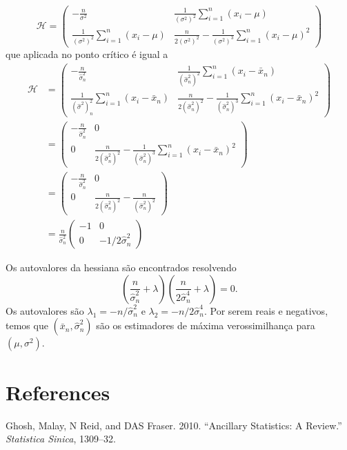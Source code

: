 \documentclass[
  letterpaper,
  DIV=11,
  numbers=noendperiod]{scrartcl}
\newlength{\cslhangindent}
\newenvironment{CSLReferences}[2] %
 {\begin{list}{}{%
  \setlength{\itemindent}{0pt}
  \setlength{\leftmargin}{0pt}
  \setlength{\parsep}{0pt}
  \ifodd #1
   \setlength{\leftmargin}{\cslhangindent}
   \setlength{\itemindent}{-1\cslhangindent}
  \fi
  \setlength{\itemsep}{#2\baselineskip}}}
 {\end{list}}
\begin{document}
\[\mathcal{H}=\left(\begin{array}{cc}
-\frac{n}{\sigma^2} & \frac{1}{(\sigma^2)^2}\sum_{i=1}^{n}(x_i-\mu) \\\frac{1}{(\sigma^2)^2}\sum_{i=1}^{n}(x_i-\mu) & \frac{n}{2(\sigma^2)^2} -\frac{1}{\left(\sigma^2\right)^3}\sum_{i=1}^{n}(x_i-\mu)^2
\end{array}\right)\] que aplicada no ponto crítico é igual a
\[\begin{align*}
\mathcal{H}&=\left(\begin{array}{cc}
-\frac{n}{\hat{\sigma}^2_n} & \frac{1}{(\hat{\sigma}^2_n)^2}\sum_{i=1}^{n}(x_i-\bar{x}_n) \\\frac{1}{(\hat{\sigma}^2)^2_n}\sum_{i=1}^{n}(x_i-\bar{x}_n) & \frac{n}{2(\hat{\sigma}^2_n)^2} -\frac{1}{\left(\hat{\sigma}^2_n\right)^3}\sum_{i=1}^{n}(x_i-\bar{x}_n)^2
\end{array}\right)\\
&=\left(\begin{array}{cc}
-\frac{n}{\hat{\sigma}^2_n} & 0 \\
0 & \frac{n}{2(\hat{\sigma}^2_n)^2} -\frac{1}{\left(\hat{\sigma}^2_n\right)^3}\sum_{i=1}^{n}(x_i-\bar{x}_n)^2
\end{array}\right)\\
&=\left(\begin{array}{cc}
-\frac{n}{\hat{\sigma}^2_n} & 0 \\
0 & \frac{n}{2(\hat{\sigma}^2_n)^2} -\frac{n}{\left(\hat{\sigma}^2_n\right)^2}
\end{array}\right)\\
&=\frac{n}{\hat{\sigma}^2_n}\left(\begin{array}{cc}
-1 & 0 \\
0 & -1/2\hat{\sigma}^2_n
\end{array}\right)
\end{align*}\]

Os autovalores da hessiana são encontrados resolvendo
\[\left(\frac{n}{\hat{\sigma}_n^2}+\lambda\right)\left(\frac{n}{2\hat{\sigma}_n^4}+\lambda\right)=0.\]
Os autovalores são \(\lambda_1=-n/\hat{\sigma}^2_n\) e
\(\lambda_2=-n/2\hat{\sigma}^4_n\). Por serem reais e negativos, temos
que \((\bar{x}_n,\hat{\sigma}^2_n)\) são os estimadores de máxima
verossimilhança para \((\mu,\sigma^2)\).


\chapter*{References}\label{references}


\label{refs}
\begin{CSLReferences}{1}{0}
Ghosh, Malay, N Reid, and DAS Fraser. 2010. {``Ancillary Statistics: A
Review.''} \emph{Statistica Sinica}, 1309--32.

\end{CSLReferences}
\end{document}
